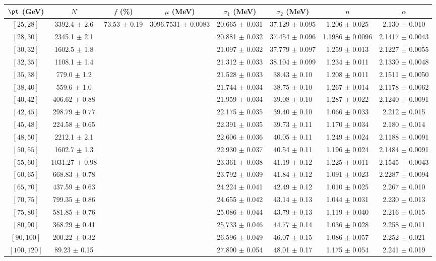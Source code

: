 \begin{tabular}{c||c|c|c|c|c|c|c}
$\pt$ (GeV) & $N$ & $f$ (\%) & $\mu$ (MeV) & $\sigma_1$ (MeV) & $\sigma_2$ (MeV) & $n$ & $\alpha$ \\
\hline
$[25, 28]$ & 3392.4 $\pm$ 2.6 & \multirow{19}{*}{73.53 $\pm$ 0.19} & \multirow{19}{*}{3096.7531 $\pm$ 0.0083} & 20.665 $\pm$ 0.031 & 37.129 $\pm$ 0.095 & 1.206 $\pm$ 0.025 & 2.130 $\pm$ 0.010\\
$[28, 30]$ & 2345.1 $\pm$ 2.1 &  &  & 20.881 $\pm$ 0.032 & 37.454 $\pm$ 0.096 & 1.1986 $\pm$ 0.0096 & 2.1417 $\pm$ 0.0043\\
$[30, 32]$ & 1602.5 $\pm$ 1.8 &  &  & 21.097 $\pm$ 0.032 & 37.779 $\pm$ 0.097 & 1.259 $\pm$ 0.013 & 2.1227 $\pm$ 0.0055\\
$[32, 35]$ & 1108.1 $\pm$ 1.4 &  &  & 21.312 $\pm$ 0.033 & 38.104 $\pm$ 0.099 & 1.234 $\pm$ 0.011 & 2.1330 $\pm$ 0.0048\\
$[35, 38]$ & 779.0 $\pm$ 1.2 &  &  & 21.528 $\pm$ 0.033 & 38.43 $\pm$ 0.10 & 1.208 $\pm$ 0.011 & 2.1511 $\pm$ 0.0050\\
$[38, 40]$ & 559.6 $\pm$ 1.0 &  &  & 21.744 $\pm$ 0.034 & 38.75 $\pm$ 0.10 & 1.267 $\pm$ 0.014 & 2.1178 $\pm$ 0.0062\\
$[40, 42]$ & 406.62 $\pm$ 0.88 &  &  & 21.959 $\pm$ 0.034 & 39.08 $\pm$ 0.10 & 1.287 $\pm$ 0.022 & 2.1240 $\pm$ 0.0091\\
$[42, 45]$ & 298.79 $\pm$ 0.77 &  &  & 22.175 $\pm$ 0.035 & 39.40 $\pm$ 0.10 & 1.066 $\pm$ 0.033 & 2.212 $\pm$ 0.015\\
$[45, 48]$ & 224.58 $\pm$ 0.65 &  &  & 22.391 $\pm$ 0.035 & 39.73 $\pm$ 0.11 & 1.170 $\pm$ 0.034 & 2.180 $\pm$ 0.014\\
$[48, 50]$ & 2212.1 $\pm$ 2.1 &  &  & 22.606 $\pm$ 0.036 & 40.05 $\pm$ 0.11 & 1.249 $\pm$ 0.024 & 2.1188 $\pm$ 0.0091\\
$[50, 55]$ & 1602.7 $\pm$ 1.3 &  &  & 22.930 $\pm$ 0.037 & 40.54 $\pm$ 0.11 & 1.196 $\pm$ 0.024 & 2.1484 $\pm$ 0.0091\\
$[55, 60]$ & 1031.27 $\pm$ 0.98 &  &  & 23.361 $\pm$ 0.038 & 41.19 $\pm$ 0.12 & 1.225 $\pm$ 0.011 & 2.1545 $\pm$ 0.0043\\
$[60, 65]$ & 668.83 $\pm$ 0.78 &  &  & 23.792 $\pm$ 0.039 & 41.84 $\pm$ 0.12 & 1.091 $\pm$ 0.023 & 2.2287 $\pm$ 0.0094\\
$[65, 70]$ & 437.59 $\pm$ 0.63 &  &  & 24.224 $\pm$ 0.041 & 42.49 $\pm$ 0.12 & 1.010 $\pm$ 0.025 & 2.267 $\pm$ 0.010\\
$[70, 75]$ & 799.35 $\pm$ 0.86 &  &  & 24.655 $\pm$ 0.042 & 43.14 $\pm$ 0.13 & 1.044 $\pm$ 0.031 & 2.230 $\pm$ 0.013\\
$[75, 80]$ & 581.85 $\pm$ 0.76 &  &  & 25.086 $\pm$ 0.044 & 43.79 $\pm$ 0.13 & 1.119 $\pm$ 0.040 & 2.216 $\pm$ 0.015\\
$[80, 90]$ & 368.29 $\pm$ 0.41 &  &  & 25.733 $\pm$ 0.046 & 44.77 $\pm$ 0.14 & 1.036 $\pm$ 0.028 & 2.258 $\pm$ 0.011\\
$[90, 100]$ & 200.22 $\pm$ 0.32 &  &  & 26.596 $\pm$ 0.049 & 46.07 $\pm$ 0.15 & 1.086 $\pm$ 0.057 & 2.252 $\pm$ 0.021\\
$[100, 120]$ & 89.23 $\pm$ 0.15 &  &  & 27.890 $\pm$ 0.054 & 48.01 $\pm$ 0.17 & 1.175 $\pm$ 0.054 & 2.241 $\pm$ 0.019\\
\end{tabular}
